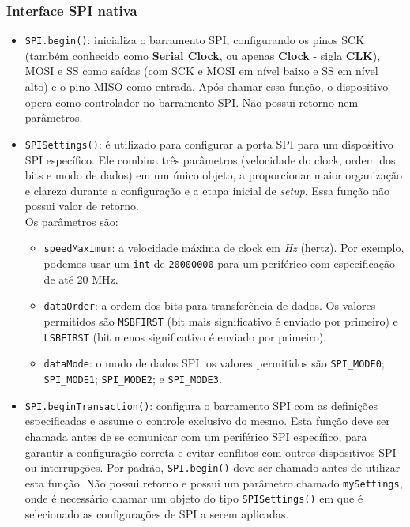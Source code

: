 \documentclass[a4paper,oneside,10pt]{article}
\begin{document}
\subsubsection{Interface SPI nativa}
\begin{itemize}
	\item \texttt{SPI.begin()}: inicializa o barramento SPI, configurando os pinos SCK (também conhecido como \textbf{Serial Clock}, ou apenas \textbf{Clock} - sigla \textbf{CLK}), MOSI e SS como saídas (com SCK e MOSI em nível baixo e SS em nível alto) e o pino MISO como entrada. Após chamar essa função, o dispositivo opera como controlador no barramento SPI. Não possui retorno nem parâmetros.
	\item \texttt{SPISettings()}: é utilizado para configurar a porta SPI para um dispositivo SPI específico. Ele combina três parâmetros (velocidade do clock, ordem dos bits e modo de dados) em um único objeto, a proporcionar maior organização e clareza durante a configuração e a etapa inicial de \textit{setup}. Essa função não possui valor de retorno. \\ Os parâmetros são:
	\begin{itemize}
		\item \texttt{speedMaximum}: a velocidade máxima de clock em \textit{Hz} (hertz). Por exemplo, podemos usar um \texttt{int} de \texttt{20000000} para um periférico com especificação de até 20 MHz.
		\item \texttt{dataOrder}: a ordem dos bits para transferência de dados. Os valores permitidos são \texttt{MSBFIRST} (bit mais significativo é enviado por primeiro) e \texttt{LSBFIRST} (bit menos significativo é enviado por primeiro).
		\item \texttt{dataMode}: o modo de dados SPI. os valores permitidos são \texttt{SPI\_MODE0}; \texttt{SPI\_MODE1}; \texttt{SPI\_MODE2}; e \texttt{SPI\_MODE3}.
	\end{itemize}
	\item \texttt{SPI.beginTransaction()}: configura o barramento SPI com as definições especificadas e assume o controle exclusivo do mesmo. Esta função deve ser chamada antes de se comunicar com um periférico SPI específico, para garantir a configuração correta e evitar conflitos com outros dispositivos SPI ou interrupções. Por padrão, \texttt{SPI.begin()} deve ser chamado antes de utilizar esta função. Não possui retorno e possui um parâmetro chamado \texttt{mySettings}, onde é necessário chamar um objeto do tipo \texttt{SPISettings()} em que é selecionado as configurações de SPI a serem aplicadas.

\end{itemize}
\end{document}

